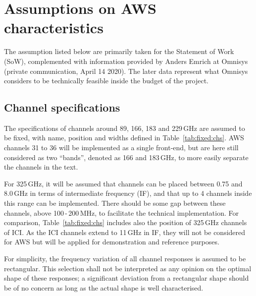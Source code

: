 \documentclass[12pt]{article}
\begin{document}
\section{Assumptions on AWS characteristics}
%
The assumption listed below are primarily taken for the Statement of Work
(SoW), complemented with information provided by Anders Emrich at Omnisys
(private communication, April 14 2020). The later data represent what Omnisys
considers to be technically feasible inside the budget of the project.

\subsection{Channel specifications}
%
The specifications of channels around 89, 166, 183 and 229\,GHz are assumed to
be fixed, with name, position and widths defined in Table~\ref{tab:fixed:chs}.
AWS channels 31 to 36 will be implemented as a single front-end, but are here
still considered as two ``bands'', denoted as 166 and 183\,GHz, to more easily
separate the channels in the text. 

For 325\,GHz, it will be assumed that channels can be placed between 0.75 and
8.0\,GHz in terms of intermediate frequency (IF), and that up to 4 channels
inside this range can be implemented. There should be some gap between these
channels, above 100\,-\,200\,MHz, to facilitate the technical implementation.
For comparison, Table~\ref{tab:fixed:chs} includes also the position of 
325\,GHz channels of ICI. As the ICI channels extend to 11\,GHz in IF, they will not
be considered for AWS but will be applied for demonstration and reference
purposes.

For simplicity, the frequency variation of all channel responses is assumed to
be rectangular. This selection shall not be interpreted as any opinion on the
optimal shape of these responses; a significant deviation from a rectangular
shape should be of no concern as long as the actual shape is well
characterised.
\end{document}
